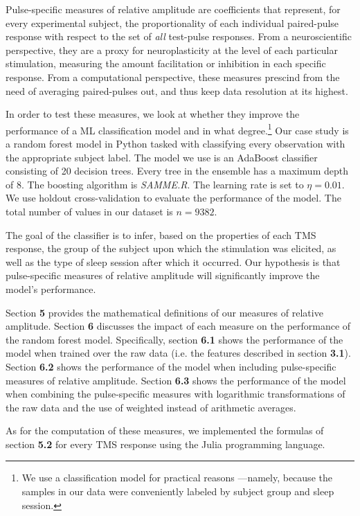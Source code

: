 \documentclass{article}
\begin{document}
\begin{multicols}{2}
Pulse-specific measures of relative amplitude are coefficients that represent,
for every experimental subject, the proportionality of each individual
paired-pulse response with respect to the set of \textit{all} test-pulse
responses. From a neuroscientific perspective, they are a proxy for
neuroplasticity at the level of each particular stimulation, measuring the
amount facilitation or inhibition in each specific response. From a
computational perspective, these measures prescind from the need of averaging
paired-pulses out, and thus keep data resolution at its highest.

In order to test these measures, we look at whether they improve the performance
of a ML classification model and in what degree.\footnote{We use a
classification model for practical reasons ---namely, because the samples in our
data were conveniently labeled by subject group and sleep session.} Our case
study is a random forest model in Python tasked with classifying every
observation with the appropriate subject label. The model we use is an AdaBoost
classifier consisting of 20 decision trees. Every tree in the ensemble has a
maximum depth of $8$. The boosting algorithm is \textit{SAMME.R}. The learning
rate is set to $\eta = 0.01$. We use holdout cross-validation to evaluate the
performance of the model. The total number of values in our dataset is $n =
9382$.

The goal of the classifier is to infer, based on the properties of each TMS
response, the group of the subject upon which the stimulation was elicited, as
well as the type of sleep session after which it occurred. Our hypothesis is
that pulse-specific measures of relative amplitude will significantly improve
the model's performance.


Section \textbf{5} provides the mathematical definitions of our measures of
relative amplitude. Section \textbf{6} discusses the impact of each measure on
the performance of the random forest model. Specifically, section \textbf{6.1}
shows the performance of the model when trained over the raw data (i.e. the
features described in section \textbf{3.1}). Section \textbf{6.2} shows the
performance of the model when including pulse-specific measures of relative
amplitude. Section \textbf{6.3} shows the performance of the model when combining the
pulse-specific measures with logarithmic transformations of the raw data and the
use of weighted instead of arithmetic averages.

As for the computation of these measures, we implemented the formulas of section
\textbf{5.2} for every TMS response using the Julia programming language.




\end{multicols}
\end{document}
